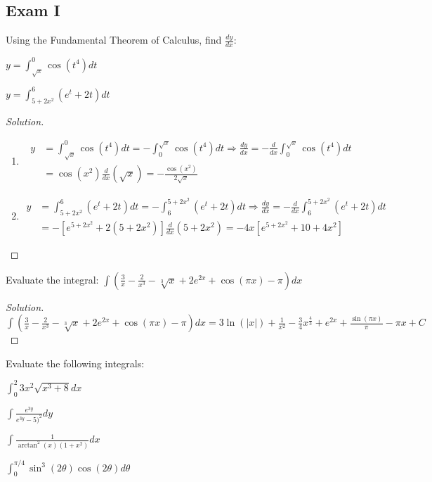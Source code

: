 \documentclass[crop=false,class=book,oneside]{standalone}
\begin{document}
\subsection{Exam I}
\begin{problem}
Using the Fundamental Theorem of Calculus, find $\frac{dy}{dx}$:
\begin{enumerate}
    \begin{multicols}{2}
        \item $y=\int_{\sqrt{x}}^{0}\cos(t^{4})dt$
        \item $y=\int_{5+2x^{2}}^{6}(e^{t}+2t)dt$
    \end{multicols}
\end{enumerate}
\end{problem}
\begin{proof}[Solution]
\
\begin{enumerate}
    \item   \begin{align*}
        y&=\int_{\sqrt{x}}^{0}\cos(t^{4})dt=-\int_{0}^{\sqrt{x}}\cos(t^{4})dt\Rightarrow     \frac{dy}{dx}=-\frac{d}{dx}\int_{0}^{\sqrt{x}}\cos(t^{4})dt\\
        &=\cos(x^{2})\frac{d}{dx}(\sqrt{x})=-\frac{\cos(x^{2})}{2\sqrt{x}}
            \end{align*}
    \item   \begin{align*}
        y&=\int_{5+2x^{2}}^{6}(e^{t}+2t)dt=-\int_{6}^{5+2x^{2}}(e^{t}+2t)dt\Rightarrow \frac{dy}{dx}=-\frac{d}{dx}\int_{6}^{5+2x^{2}}(e^{t}+2t)dt\\
        &=-[e^{5+2x^{2}}+2(5+2x^{2})]\frac{d}{dx}(5+2x^{2})=-4x[e^{5+2x^{2}}+10+4x^{2}]
            \end{align*}
\end{enumerate}
\end{proof}
\begin{problem}
Evaluate the integral: $\int(\frac{3}{x}-\frac{2}{x^{3}}-\sqrt[3]{x}+2e^{2x}+\cos(\pi x)-\pi)dx$
\end{problem}
\begin{proof}[Solution]
$\int(\frac{3}{x}-\frac{2}{x^{3}}-\sqrt[3]{x}+2e^{2x}+\cos(\pi x)-\pi)dx=3\ln(|x|)+\frac{1}{x^{2}}-\frac{3}{4}x^{\frac{4}{3}}+e^{2x}+\frac{\sin(\pi x)}{\pi}-\pi x+C$
\end{proof}
\begin{problem}
Evaluate the following integrals:
\begin{enumerate}
\end{enumerate}
\end{problem}
\end{document}
